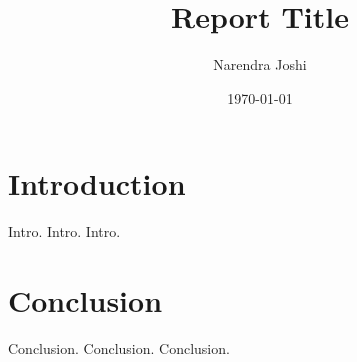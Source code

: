 \documentclass[12pt]{report}
\title{Report Title}
\author{Narendra Joshi}
\date{\today}
\begin{document}
\maketitle

\chapter{Introduction}
Intro. Intro. Intro.

\chapter{Conclusion}
Conclusion. Conclusion. Conclusion.

\printbibliography

\end{document}
